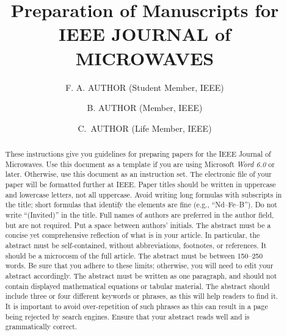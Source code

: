 \documentclass{IEEEjmw}
\begin{document}

\title{Preparation of Manuscripts for IEEE {JOURNAL of MICROWAVES}} 


\author{F. A. AUTHOR (Student Member, IEEE)}

\author{B. AUTHOR  (Member, IEEE)}

\author{C.~AUTHOR (Life Member, IEEE)}





\begin{abstract}
These instructions give you guidelines for preparing papers for the IEEE Journal of Microwaves. Use this document as a template if you are using Microsoft {\it Word 6.0} or later. Otherwise, use this document as an instruction set. The electronic file of your paper will be formatted further at IEEE. Paper titles should be written in uppercase and lowercase letters, not all uppercase. Avoid writing long formulas with subscripts in the title; short formulas that identify the elements are fine (e.g., ``Nd--Fe--B''). Do not write ``(Invited)'' in the title. Full names of authors are preferred in the author field, but are not required. Put a space between authors' initials. The abstract must be a concise yet comprehensive reflection of what is in your article. In particular, the abstract must be self-contained, without abbreviations, footnotes, or references. It should be a microcosm of the full article. The abstract must be between 150--250 words. Be sure that you adhere to these limits; otherwise, you will need to edit your abstract accordingly. The abstract must be written as one paragraph, and should not contain displayed mathematical equations or tabular material. The abstract should include three or four different keywords or phrases, as this will help readers to find it. It is important to avoid over-repetition of such phrases as this can result in a page being rejected by search engines. Ensure that your abstract reads well and is grammatically correct.
\end{abstract}
\end{document}
